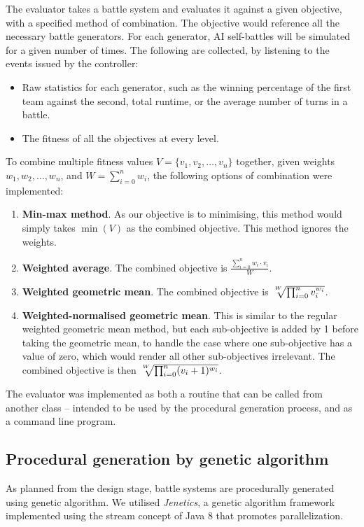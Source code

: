 The evaluator takes a battle system and evaluates it against a given objective, with a specified method of combination. The objective would reference all the necessary battle generators. For each generator, AI self-battles will be simulated for a given number of times. The following are collected, by listening to the events issued by the controller:
\begin{itemize}
	\item Raw statistics for each generator, such as the winning percentage of the first team against the second, total runtime, or the average number of turns in a battle.
	\item The fitness of all the objectives at every level.
\end{itemize}

To combine multiple fitness values $V = \{v_1, v_2, \ldots, v_n\}$ together, given weights $w_1, w_2, \ldots, w_n$, and $W = \sum_{i=0}^{n} w_i$, the following options of combination were implemented:
\begin{enumerate}
	\item \textbf{Min-max method}. As our objective is to minimising, this method would simply takes $\min(V)$ as the combined objective. This method ignores the weights.
	\item \textbf{Weighted average}. The combined objective is $\frac{\sum_{i=0}^{n} w_i \cdot v_i}{W}$.
	\item \textbf{Weighted geometric mean}. The combined objective is $  \sqrt[\uproot{3}W]{ \prod_{i=0}^{n} v_i^{w_i}}$.
	\item \textbf{Weighted-normalised geometric mean}. This is similar to the regular weighted geometric mean method, but each sub-objective is added by 1 before taking the geometric mean, to handle the case where one sub-objective has a value of zero, which would render all other sub-objectives irrelevant. The combined objective is then $\sqrt[\uproot{3}W]{ \prod_{i=0}^{n} (v_i + 1)^{w_i}}$.
\end{enumerate}

The evaluator was implemented as both a routine that can be called from another class -- intended to be used by the procedural generation process, and as a command line program.

\subsection{Procedural generation by genetic algorithm}

As planned from the design stage, battle systems are procedurally generated using genetic algorithm. We utilised \textit{Jenetics}, a genetic algorithm framework implemented using the stream concept of Java 8 that promotes parallelization.

